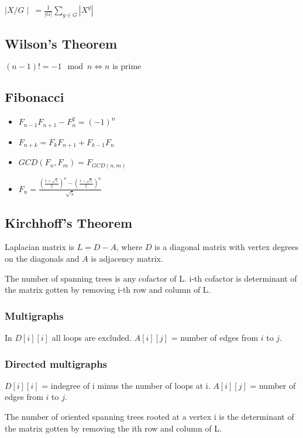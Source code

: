 \documentclass[a4paper,10pt,oneside]{article}
\begin{document}
\begin{multicols}{2}
$\mid X / G\mid~= \frac{1}{|G|} \sum_{g \in G}{|X^g|}$

\subsection{Wilson's Theorem}
$(n-1)! = -1 \mod n \iff n\text{ is prime}$

\subsection{Fibonacci}
\begin{itemize}
\item $F_{n-1}F_{n+1} - F_n^2 = (-1)^n$
\item $F_{n+k} = F_kF_{n+1} + F_{k-1}F_n$
\item $GCD(F_n, F_m) = F_{GCD(n, m)}$
\item $F_n = \frac{(\frac{1+\sqrt{5}}{2})^n - (\frac{1-\sqrt{5}}{2})^n}{\sqrt{5}}$
\end{itemize}

\subsection{Kirchhoff's Theorem}
Laplacian matrix is $L = D - A$, where $D$ is a diagonal matrix with vertex degrees on the diagonals and $A$ is adjacency matrix.

The number of spanning trees is any cofactor of L. i-th cofactor is determinant of the matrix gotten by removing i-th row and column of L.

\subsubsection{Multigraphs}
In $D[i][i]$ all loops are excluded. $A[i][j]$ = number of edges from $i$ to $j$.

\subsubsection{Directed multigraphs}
$D[i][i]$ = indegree of i minus the number of loops at i. $A[i][j]$ = number of edges from $i$ to $j$.

The number of oriented spanning trees rooted at a vertex i is the determinant of the matrix gotten by removing the ith row and column of L.


\end{multicols}
\end{document}
